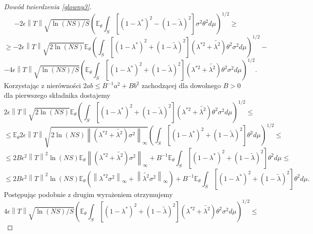 \documentclass{mwart}
\newcommand{\norm}[1]{\left\lVert#1\right\rVert}
\begin{document}
\begin{proof}[Dowód twierdzenia \ref{glowny3}]
\begin{displaymath}
-2\epsilon\norm{T}\sqrt{\ln (NS)/S}\left(\mathbb{E}_{\theta}\int_S[(1-\lambda^*)^2-(1-\tilde{\lambda})^2]\sigma^2\theta ^2 d\mu\right)^{1/2}\geq
\end{displaymath}
\begin{displaymath}
\geq -2\epsilon\norm{T}\sqrt{2\ln (NS)}\mathbb{E}_{\theta}\left(\int_S[(1-\lambda^*)^2+(1-\tilde{\lambda})^2](\lambda^{*2}+\tilde{\lambda^2})\theta ^2\sigma^2d\mu\right)^{1/2}-
\end{displaymath}
\begin{displaymath}
-4\epsilon\norm{T}\sqrt{\ln (NS)/S}\left(\mathbb{E}_{\theta}\int_S[(1-\lambda^*)^2+(1-\tilde{\lambda})^2](\lambda^{*2}+\tilde{\lambda^2})\theta ^2\sigma^2 d\mu\right)^{1/2}.
\end{displaymath}
Korzystając  z nierówności $2ab\leq B^{-1}a^2+Bb^2$ zachodzącej dla dowolnego $B>0$ dla pierwszego składnika dostajemy
\begin{displaymath}
2\epsilon\norm{T}\sqrt{2\ln (NS)}\mathbb{E}_{\theta}\left(\int_S[(1-\lambda^*)^2+(1-\tilde{\lambda})^2](\lambda^{*2}+\tilde{\lambda^2})\theta ^2\sigma^2d\mu\right)^{1/2}\leq
\end{displaymath}
\begin{displaymath}
\leq \mathbb{E}_{\theta}2\epsilon\norm{T}\sqrt{2\ln (NS)\norm{(\lambda^{*2}+\tilde{\lambda^2})\sigma^2}_{\infty}}\left(\int_S[(1-\lambda^*)^2+(1-\tilde{\lambda})^2]\theta ^2d\mu\right)^{1/2}\leq
\end{displaymath}
\begin{displaymath}
\leq 2B\epsilon^2\norm{T}^2 \ln (NS)\mathbb{E}_{\theta}\norm{(\lambda^{*2}+\tilde{\lambda^2})\sigma^2}_{\infty}+B^{-1}\mathbb{E}_{\theta}\int_S[(1-\lambda^*)^2+(1-\tilde{\lambda})^2]\theta ^2d\mu\leq
\end{displaymath}
\begin{displaymath}
\leq 2B\epsilon^2\norm{T}^2 \ln (NS)\mathbb{E}_{\theta}\left(\norm{\lambda^{*2}\sigma^2}_{\infty}+\norm{\tilde{\lambda^2}\sigma^2}_{\infty}\right)+B^{-1}\mathbb{E}_{\theta}\int_S[(1-\lambda^*)^2+(1-\tilde{\lambda})^2]\theta ^2d\mu.
\end{displaymath}
Postępując podobnie z drugim wyrażeniem otrzymujemy
\begin{displaymath}
4\epsilon\norm{T}\sqrt{\ln (NS)/S}\left(\mathbb{E}_{\theta}\int_S[(1-\lambda^*)^2+(1-\tilde{\lambda})^2](\lambda^{*2}+\tilde{\lambda^2})\theta ^2\sigma^2 d\mu\right)^{1/2}\leq
\end{displaymath}
\begin{displaymath}

\end{displaymath}
\end{proof}
\end{document}
